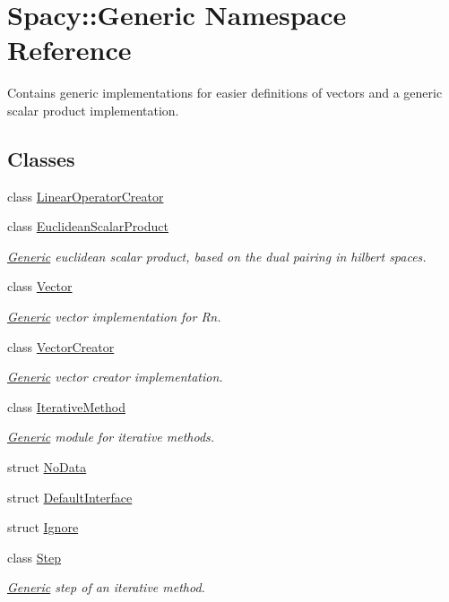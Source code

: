 \hypertarget{namespaceSpacy_1_1Generic}{\section{Spacy\-:\-:Generic Namespace Reference}
\label{namespaceSpacy_1_1Generic}
}


Contains generic implementations for easier definitions of vectors and a generic scalar product implementation.  


\subsection*{Classes}
\begin{DoxyCompactItemize}
\item 
class \hyperlink{classSpacy_1_1Generic_1_1LinearOperatorCreator}{Linear\-Operator\-Creator}
\item 
class \hyperlink{classSpacy_1_1Generic_1_1EuclideanScalarProduct}{Euclidean\-Scalar\-Product}
\begin{DoxyCompactList}\small\item\em \hyperlink{namespaceSpacy_1_1Generic}{Generic} euclidean scalar product, based on the dual pairing in hilbert spaces. \end{DoxyCompactList}\item 
class \hyperlink{classSpacy_1_1Generic_1_1Vector}{Vector}
\begin{DoxyCompactList}\small\item\em \hyperlink{namespaceSpacy_1_1Generic}{Generic} vector implementation for Rn. \end{DoxyCompactList}\item 
class \hyperlink{classSpacy_1_1Generic_1_1VectorCreator}{Vector\-Creator}
\begin{DoxyCompactList}\small\item\em \hyperlink{namespaceSpacy_1_1Generic}{Generic} vector creator implementation. \end{DoxyCompactList}\item 
class \hyperlink{classSpacy_1_1Generic_1_1IterativeMethod}{Iterative\-Method}
\begin{DoxyCompactList}\small\item\em \hyperlink{namespaceSpacy_1_1Generic}{Generic} module for iterative methods. \end{DoxyCompactList}\item 
struct \hyperlink{structSpacy_1_1Generic_1_1NoData}{No\-Data}
\item 
struct \hyperlink{structSpacy_1_1Generic_1_1DefaultInterface}{Default\-Interface}
\item 
struct \hyperlink{structSpacy_1_1Generic_1_1Ignore}{Ignore}
\item 
class \hyperlink{classSpacy_1_1Generic_1_1Step}{Step}
\begin{DoxyCompactList}\small\item\em \hyperlink{namespaceSpacy_1_1Generic}{Generic} step of an iterative method. \end{DoxyCompactList}\end{DoxyCompactItemize}
